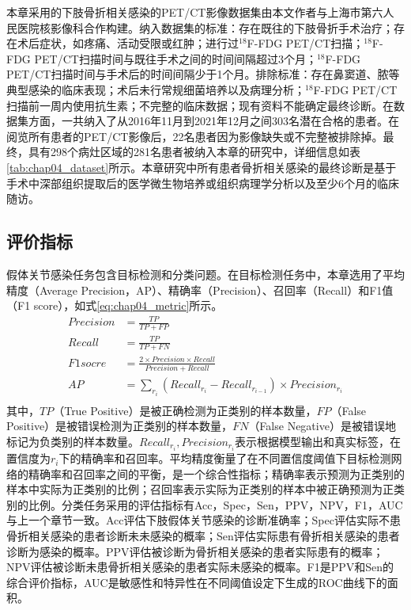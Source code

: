 本章采用的下肢骨折相关感染的PET/CT影像数据集由本文作者与上海市第六人民医院核影像科合作构建。纳入数据集的标准：存在既往的下肢骨折手术治疗；存在术后症状，如疼痛、活动受限或红肿；进行过\(^{18}\)F-FDG PET/CT扫描；\(^{18}\)F-FDG PET/CT扫描时间与既往手术之间的时间间隔超过3个月；\(^{18}\)F-FDG PET/CT扫描时间与手术后的时间间隔少于1个月。排除标准：存在鼻窦道、脓等典型感染的临床表现；术后未行常规细菌培养以及病理分析；\(^{18}\)F-FDG PET/CT扫描前一周内使用抗生素；不完整的临床数据；现有资料不能确定最终诊断。在数据集方面，一共纳入了从2016年11月到2021年12月之间303名潜在合格的患者。在阅览所有患者的PET/CT影像后，22名患者因为影像缺失或不完整被排除掉。最终，具有298个病灶区域的281名患者被纳入本章的研究中，详细信息如表\ref{tab:chap04_dataset}所示。本章研究中所有患者骨折相关感染的最终诊断是基于手术中深部组织提取后的医学微生物培养或组织病理学分析以及至少6个月的临床随访。

\subsection{评价指标}

假体关节感染任务包含目标检测和分类问题。在目标检测任务中，本章选用了平均精度（Average Precision，AP）、精确率（Precision）、召回率（Recall）和F1值（F1 score），如式\ref{eq:chap04_metric}所示。
\begin{equation}
    \begin{aligned}
        Precision & = \frac{TP}{TP+FP}                                                   \\
        Recall    & = \frac{TP}{TP+FN}                                                   \\
        F1 socre  & = \frac{2 \times Precision \times Recall}{Precision + Recall}        \\
        AP        & = \sum_{r_i}(Recall_{r_i} - Recall_{r_{i-1}}) \times Precision_{r_i} \\
    \end{aligned}
    \label{eq:chap04_metric}
\end{equation}
其中，\(TP\)（True Positive）是被正确检测为正类别的样本数量，\(FP\)（False Positive）是被错误检测为正类别的样本数量，\(FN\)（False Negative）是被错误地标记为负类别的样本数量。\(Recall_{r_i}, Precision_{r_i}\)表示根据模型输出和真实标签，在置信度为\(r_i\)下的精确率和召回率。平均精度衡量了在不同置信度阈值下目标检测网络的精确率和召回率之间的平衡，是一个综合性指标；精确率表示预测为正类别的样本中实际为正类别的比例；召回率表示实际为正类别的样本中被正确预测为正类别的比例。分类任务采用的评估指标有Acc，Spec，Sen，PPV，NPV，F1，AUC与上一个章节一致。Acc评估下肢假体关节感染的诊断准确率；Spec评估实际不患骨折相关感染的患者诊断未未感染的概率；Sen评估实际患有骨折相关感染的患者诊断为感染的概率。PPV评估被诊断为骨折相关感染的患者实际患有的概率；NPV评估被诊断未患骨折相关感染的患者实际未感染的概率。F1是PPV和Sen的综合评价指标，AUC是敏感性和特异性在不同阈值设定下生成的ROC曲线下的面积。

